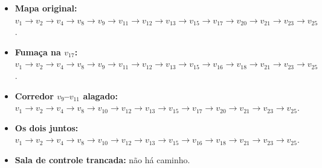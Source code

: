 \begin{itemize}
\item \textbf{Mapa original:} $v_{1} \to v_{2} \to v_{4} \to v_{8} \to v_{9} \to v_{11} \to v_{12} \to v_{13} \to v_{15} \to v_{17} \to v_{20} \to v_{21} \to v_{23} \to v_{25}$.
\item \textbf{Fumaça na $v_{17}$:} $v_{1} \to v_{2} \to v_{4} \to v_{8} \to v_{9} \to v_{11} \to v_{12} \to v_{13} \to v_{15} \to v_{16} \to v_{18} \to v_{21} \to v_{23} \to v_{25}$.
\item \textbf{Corredor $v_9$--$v_{11}$ alagado:} $v_{1} \to v_{2} \to v_{4} \to v_{8} \to v_{10} \to v_{12} \to v_{13} \to v_{15} \to v_{17} \to v_{20} \to v_{21} \to v_{23} \to v_{25}$.
\item \textbf{Os dois juntos:} $v_{1} \to v_{2} \to v_{4} \to v_{8} \to v_{10} \to v_{12} \to v_{13} \to v_{15} \to v_{16} \to v_{18} \to v_{21} \to v_{23} \to v_{25}$.
\item \textbf{Sala de controle trancada:} não há caminho.
\end{itemize}
